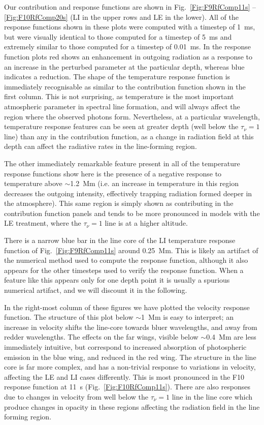 Our contribution and response functions are shown in Fig.~\ref{Fig:F9RfComp11s} -- \ref{Fig:F10RfComp20s} (LI in the upper rows and LE in the lower).
All of the response functions shown in these plots were computed with a timestep of \SI{1}{\milli\second}, but were visually identical to those computed for a timestep of \SI{5}{\milli\second} and extremely similar to those computed for a timestep of \SI{0.01}{\milli\second}.
In the response function plots red shows an enhancement in outgoing radiation as a response to an increase in the perturbed parameter at the particular depth, whereas blue indicates a reduction.
The shape of the temperature response function is immediately recognisable as similar to the contribution function shown in the first column.
This is not surprising, as temperature is the most important atmospheric parameter in spectral line formation, and will always affect the region where the observed photons form.
Nevertheless, at a particular wavelength, temperature response features can be seen at greater depth (well below the $\tau_\nu=1$ line) than any in the contribution function, as a change in radiation field at this depth can affect the radiative rates in the line-forming region.

The other immediately remarkable feature present in all of the temperature response functions show here is the presence of a negative response to temperature above $\sim$\SI{1.2}{\mega\metre} (i.e. an increase in temperature in this region decreases the outgoing intensity, effectively trapping radiation formed deeper in the atmosphere).
This same region is simply shown as contributing in the contribution function panels and tends to be more pronounced in models with the LE treatment, where the $\tau_\nu=1$ line is at a higher altitude.

There is a narrow blue bar in the line core of the LI temperature response function of Fig.~\ref{Fig:F9RfComp11s} around \SI{0.25}{\mega\metre}.
This is likely an artifact of the numerical method used to compute the response function, although it also appears for the other timesteps used to verify the response function.
When a feature like this appears only for one depth point it is usually a spurious numerical artifact, and we will discount it in the following.

In the right-most column of these figures we have plotted the velocity response function.
The structure of this plot below $\sim$\SI{1}{\mega\metre} is easy to interpret; an increase in velocity shifts the line-core towards bluer wavelengths, and away from redder wavelengths.
The effects on the far wings, visible below $\sim$\SI{0.4}{\mega\metre} are less immediately intuitive, but correspond to increased absorption of photospheric emission in the blue wing, and reduced in the red wing.
The structure in the line core is far more complex, and has a non-trivial response to variations in velocity, affecting the LE and LI cases differently.
This is most pronounced in the F10 response function at \SI{11}{\second} (Fig.~\ref{Fig:F10RfComp11s}).
There are also responses due to changes in velocity from well below the $\tau_\nu=1$ line in the line core which produce changes in opacity in these regions affecting the radiation field in the line forming region.

